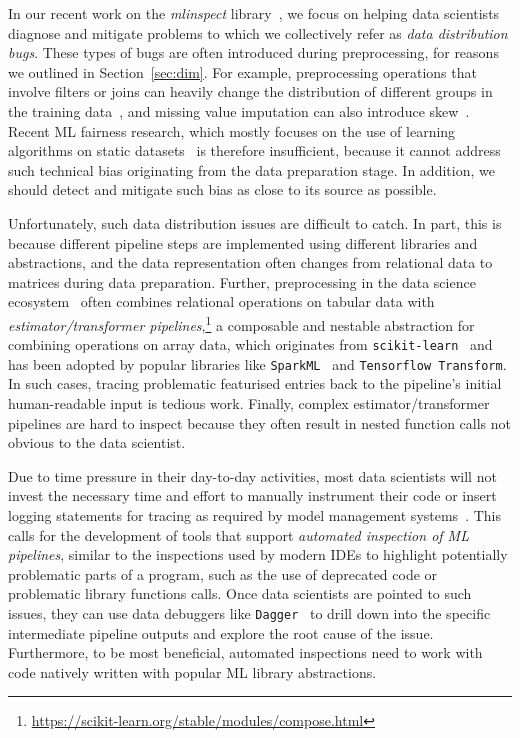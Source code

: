 \documentclass[11pt]{article}
\newcommand{\stt}[1]{{\footnotesize\texttt{#1}}}
\begin{document}
In our recent work on the \textit{mlinspect} library~\cite{grafberger2021mlinspect}, we focus on helping data scientists diagnose and mitigate problems to which we collectively refer as \emph{data distribution bugs}. These types of bugs are often introduced during preprocessing, for reasons we outlined in Section~\ref{sec:dim}.  For example, preprocessing operations that involve filters or joins can heavily change the distribution of different groups in the training data~\cite{fairdags}, and missing value imputation can also introduce skew~\cite{schelter2019fairprep}.  Recent ML fairness research, which mostly focuses on the use of learning algorithms on static datasets~\cite{DBLP:journals/cacm/ChouldechovaR20} is therefore insufficient, because it cannot address such technical bias originating from the data preparation stage. In addition, we should detect and mitigate such bias as close to its source as possible.

Unfortunately, such data distribution issues are difficult to catch. In part, this is because different pipeline steps are implemented using different libraries and abstractions, and the data representation often changes from relational data to matrices during data preparation. Further, preprocessing in the data science ecosystem~\cite{dataScienceLookingGlass} often combines relational operations on tabular data with  \textit{estimator/transformer pipelines},\footnote{\url{https://scikit-learn.org/stable/modules/compose.html}} a composable and nestable abstraction for combining operations on array data, which originates from \stt{scikit-learn}~\cite{Pedregosa2011} and has been adopted by popular libraries like \stt{SparkML}~\cite{meng2016mllib} and \stt{Tensorflow Transform}. In such cases, tracing problematic  featurised entries back to the pipeline's initial human-readable input is tedious work.  Finally, complex estimator/transformer pipelines are hard to inspect because they often result in nested function calls not obvious to the data scientist.

Due to time pressure in their day-to-day activities, most data scientists will not invest the necessary time and effort to manually instrument their code or insert logging statements for tracing as required by model management systems~\cite{Vartak2018,zaharia2018accelerating}.  This calls for the development of tools that support \emph{automated inspection of ML pipelines}, similar to the inspections used by modern IDEs to highlight potentially problematic parts of a program, such as the use of deprecated code or problematic library functions calls. Once data scientists are pointed to such issues, they can use data debuggers like \stt{Dagger}~\cite{maddendagger} to drill down into the specific intermediate pipeline outputs and explore the root cause of the issue. Furthermore, to be most beneficial, automated inspections need to work with code natively written with popular ML library abstractions. 
\end{document}
